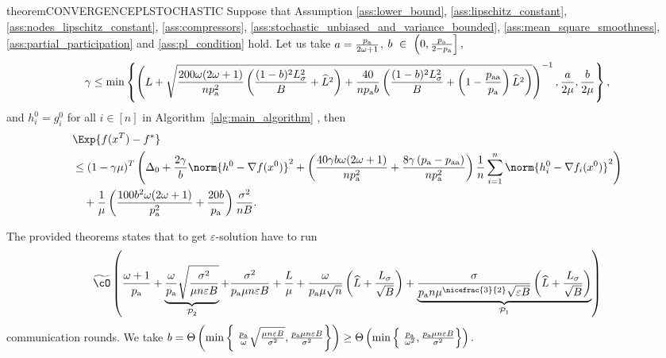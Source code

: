\documentclass{article}
\newcommand{\algorithmname}{DASHA-PP}
\newcommand*{\probavailable}{\ensuremath{p_{\textnormal{a}}}}
\newcommand*{\probpairaa}{\ensuremath{p_{\textnormal{aa}}}}
\begin{document}
\begin{restatable}{theorem}{CONVERGENCEPLSTOCHASTIC}
  \label{theorem:stochastic_pl}
  Suppose that Assumption \ref{ass:lower_bound}, \ref{ass:lipschitz_constant}, \ref{ass:nodes_lipschitz_constant}, \ref{ass:compressors}, \ref{ass:stochastic_unbiased_and_variance_bounded}, \ref{ass:mean_square_smoothness}, \ref{ass:partial_participation} and \ref{ass:pl_condition} hold. Let us take $a = \frac{\probavailable}{2\omega + 1}$, $b~\in~\left(0, \frac{\probavailable}{2 - \probavailable}\right],$
  $$\gamma \leq \min\left\{\left(L + \sqrt{\frac{200 \omega (2 \omega + 1)}{n \probavailable^2} \left(\frac{(1 - b)^2 L_{\sigma}^2}{B} + \widehat{L}^2\right) + \frac{40}{n \probavailable b}\left(\frac{(1 - b)^2 L_{\sigma}^2}{B} + \left(1 - \frac{\probpairaa}{\probavailable}\right) \widehat{L}^2 \right)}\right)^{-1}, \frac{a}{2\mu} , \frac{b}{2\mu}\right\},$$
  and $h^{0}_i = g^{0}_i$ for all $i \in [n]$ in Algorithm~\ref{alg:main_algorithm} \algname{(\algorithmname-MVR)},
  then 
  \begin{align*}
      &\Exp{f(x^{T}) - f^*} \\
      &\leq (1 - \gamma \mu)^{T}\left(\Delta_0 + \frac{2 \gamma}{b} \norm{h^{0} - \nabla f(x^{0})}^2 + \left(\frac{40 \gamma b \omega (2 \omega + 1)}{n \probavailable^2} + \frac{8 \gamma \left(\probavailable - \probpairaa\right)}{n \probavailable^2}\right)\frac{1}{n}\sum_{i=1}^n\norm{h^{0}_i - \nabla f_i(x^{0})}^2\right) \\
      &\quad + \frac{1}{\mu}\left(\frac{100 b^2 \omega (2 \omega + 1)}{\probavailable^2} + \frac{20 b}{\probavailable}\right) \frac{\sigma^2}{n B}.
  \end{align*}
\end{restatable}

The provided theorems states that to get $\varepsilon$-solution \algname{\algorithmname} have to run
\begin{align}
  \label{eq:pl_compare:new:mvr}
  \widetilde{\cO}\left(\frac{\omega + 1}{\probavailable} + \underbrace{\frac{\omega}{\probavailable}\sqrt{\frac{\sigma^2}{\mu n \varepsilon B}}}_{\mathcal{P}_2} + \frac{\sigma^2}{\probavailable \mu n \varepsilon B} + \frac{L}{\mu} + \frac{\omega}{\probavailable \mu \sqrt{n}} \left(\widehat{L} + \frac{L_{\sigma}}{\sqrt{B}}\right) + \underbrace{\frac{\sigma}{\probavailable n \mu^{\nicefrac{3}{2}} \sqrt{\varepsilon B}}\left(\widehat{L} + \frac{L_{\sigma}}{\sqrt{B}}\right)}_{\mathcal{P}_1}\right)
\end{align}
communication rounds. We take $b = \Theta\left(\min \left\{\ \frac{\probavailable}{\omega} \sqrt{\frac{\mu n \varepsilon B}{\sigma^2}}, \frac{\probavailable \mu n \varepsilon B}{\sigma^2}\right\}\right) \geq \Theta\left(\min \left\{\ \frac{\probavailable}{\omega^2}, \frac{\probavailable \mu n \varepsilon B}{\sigma^2}\right\}\right).$
\end{document}
